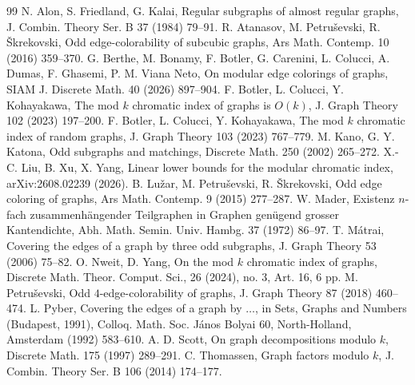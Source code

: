 \documentclass[10pt,a4paper]{amsart}
\begin{document}
\begin{thebibliography}{99}
 N. Alon, S. Friedland, G. Kalai, Regular subgraphs of almost regular graphs, J. Combin. Theory Ser. B 37 (1984) 79--91.
 R. Atanasov, M. Petru\v{s}evski, R. \v{S}krekovski, Odd edge-colorability of subcubic graphs, Ars Math. Contemp. 10 (2016) 359--370.
 G. Berthe, M. Bonamy, F. Botler, G. Carenini, L. Colucci, A. Dumas, F. Ghasemi, P. M. Viana Neto, On modular edge colorings of graphs, SIAM J. Discrete Math. 40 (2026) 897--904.
 F. Botler, L. Colucci, Y. Kohayakawa, The mod $k$ chromatic index of graphs is $O(k)$, J. Graph Theory 102 (2023) 197--200.
 F. Botler, L. Colucci, Y. Kohayakawa, The mod $k$ chromatic index of random graphs, J. Graph Theory 103 (2023) 767--779.
 M. Kano, G. Y. Katona, Odd subgraphs and matchings, Discrete Math. 250 (2002) 265--272.
 X.-C. Liu, B. Xu, X. Yang, Linear lower bounds for the modular chromatic index, arXiv:2608.02239 (2026).
 B. Lu\v{z}ar, M. Petru\v{s}evski, R. \v{S}krekovski, Odd edge coloring of graphs, Ars Math. Contemp. 9 (2015) 277--287.
 W. Mader, Existenz $n$-fach zusammenh\"an\-gender Teil\-graphen in Graphen gen\"u\-gend grosser Kanten\-dichte, Abh. Math. Semin. Univ. Hambg. 37 (1972) 86--97.
 T. M\'atrai, Covering the edges of a graph by three odd subgraphs, J. Graph Theory 53 (2006) 75--82.
 O. Nweit, D. Yang, On the mod $k$ chromatic index of graphs, Discrete Math. Theor. Comput. Sci., 26 (2024), no. 3, Art. 16, 6 pp.
 M. Petru\v{s}evski, Odd $4$-edge-colorability of graphs, J. Graph Theory 87 (2018) 460--474.
 L. Pyber, Covering the edges of a graph by $\ldots$, in Sets, Graphs and Numbers (Budapest, 1991), Colloq. Math. Soc. J\'anos Bolyai 60, North-Holland, Amsterdam (1992) 583--610.
 A. D. Scott, On graph decompositions modulo $k$, Discrete Math. 175 (1997) 289--291.
 C. Thomassen, Graph factors modulo $k$, J. Combin. Theory Ser. B 106 (2014) 174--177.
\end{thebibliography}
\end{document}

